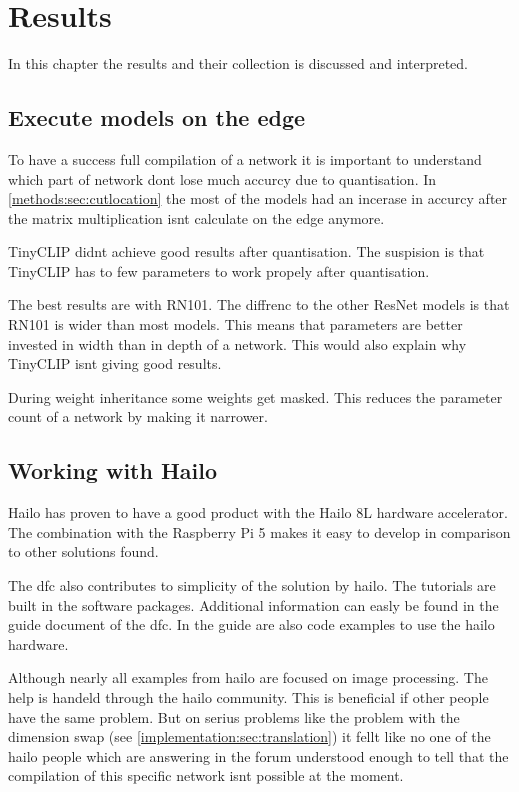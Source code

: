 \chapter{Results}
In this chapter the results and their collection is discussed and interpreted.







\section{Execute models on the edge}
To have a success full compilation of a network it is important to understand which part of network dont lose much accurcy due to quantisation.
In \cref{methods:sec:cutlocation} the most of the models had an incerase in accurcy after the matrix multiplication isnt calculate on the edge anymore.

TinyCLIP didnt achieve good results after quantisation.
The suspision is that TinyCLIP has to few parameters to work propely after quantisation.

The best results are with RN101.
The diffrenc to the other ResNet models is that RN101 is wider than most models.
This means that parameters are better invested in width than in depth of a network.
This would also explain why TinyCLIP isnt giving good results.

During weight inheritance some weights get masked.
This reduces the parameter count of a network by making it narrower.

\section{Working with Hailo}

Hailo has proven to have a good product with the Hailo 8L hardware accelerator.
The combination with the Raspberry Pi 5 makes it easy to develop in comparison to other solutions found.

The \acrshort{dfc} also contributes to simplicity of the solution by hailo.
The tutorials are built in the software packages.
Additional information can easly be found in the guide document of the \acrshort{dfc}.
In the guide are also code examples to use the hailo hardware.

Although nearly all examples from hailo are focused on image processing.
The help is handeld through the hailo community.
This is beneficial if other people have the same problem.
But on serius problems like the problem with the dimension swap (see \cref{implementation:sec:translation}) it fellt like no one of the hailo people which are answering in the forum understood enough to tell that the compilation of this specific network isnt possible at the moment.

